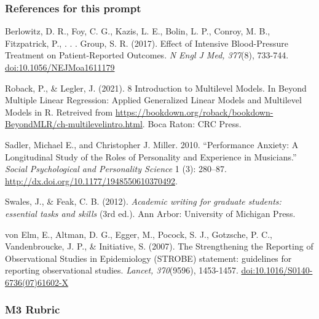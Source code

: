 \documentclass[
  openany]{book}
\begin{document}
\hypertarget{references-for-this-prompt}{%
\subsubsection{References for this prompt}\label{references-for-this-prompt}}

Berlowitz, D. R., Foy, C. G., Kazis, L. E., Bolin, L. P., Conroy, M. B., Fitzpatrick, P., . . . Group, S. R. (2017). Effect of Intensive Blood-Pressure Treatment on Patient-Reported Outcomes. \emph{N Engl J Med, 377}(8), 733-744. \url{doi:10.1056/NEJMoa1611179}

Roback, P., \& Legler, J. (2021). 8 Introduction to Multilevel Models. In Beyond Multiple Linear Regression: Applied Generalized Linear Models and Multilevel Models in R. Retreived from \url{https://bookdown.org/roback/bookdown-BeyondMLR/ch-multilevelintro.html}. Boca Raton: CRC Press.

Sadler, Michael E., and Christopher J. Miller. 2010. ``Performance Anxiety: A Longitudinal Study of the Roles of Personality and Experience in Musicians.'' \emph{Social Psychological and Personality Science} 1 (3): 280--87. \url{http://dx.doi.org/10.1177/1948550610370492}.

Swales, J., \& Feak, C. B. (2012). \emph{Academic writing for graduate students: essential tasks and skills} (3rd ed.). Ann Arbor: University of Michigan Press.

von Elm, E., Altman, D. G., Egger, M., Pocock, S. J., Gotzsche, P. C., Vandenbroucke, J. P., \& Initiative, S. (2007). The Strengthening the Reporting of Observational Studies in Epidemiology (STROBE) statement: guidelines for reporting observational studies. \emph{Lancet, 370}(9596), 1453-1457. \url{doi:10.1016/S0140-6736(07)61602-X}

\hypertarget{m3-rubric}{%
\subsubsection{M3 Rubric}\label{m3-rubric}}
\end{document}
